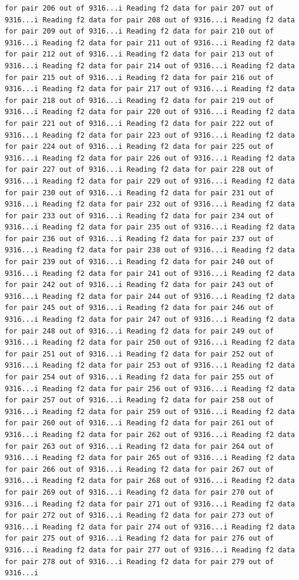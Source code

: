 \documentclass[
]{article}
\begin{document}
\begin{verbatim}
for pair 206 out of 9316...i Reading f2 data for pair 207 out of 9316...i Reading f2 data for pair 208 out of 9316...i Reading f2 data for pair 209 out of 9316...i Reading f2 data for pair 210 out of 9316...i Reading f2 data for pair 211 out of 9316...i Reading f2 data for pair 212 out of 9316...i Reading f2 data for pair 213 out of 9316...i Reading f2 data for pair 214 out of 9316...i Reading f2 data for pair 215 out of 9316...i Reading f2 data for pair 216 out of 9316...i Reading f2 data for pair 217 out of 9316...i Reading f2 data for pair 218 out of 9316...i Reading f2 data for pair 219 out of 9316...i Reading f2 data for pair 220 out of 9316...i Reading f2 data for pair 221 out of 9316...i Reading f2 data for pair 222 out of 9316...i Reading f2 data for pair 223 out of 9316...i Reading f2 data for pair 224 out of 9316...i Reading f2 data for pair 225 out of 9316...i Reading f2 data for pair 226 out of 9316...i Reading f2 data for pair 227 out of 9316...i Reading f2 data for pair 228 out of 9316...i Reading f2 data for pair 229 out of 9316...i Reading f2 data for pair 230 out of 9316...i Reading f2 data for pair 231 out of 9316...i Reading f2 data for pair 232 out of 9316...i Reading f2 data for pair 233 out of 9316...i Reading f2 data for pair 234 out of 9316...i Reading f2 data for pair 235 out of 9316...i Reading f2 data for pair 236 out of 9316...i Reading f2 data for pair 237 out of 9316...i Reading f2 data for pair 238 out of 9316...i Reading f2 data for pair 239 out of 9316...i Reading f2 data for pair 240 out of 9316...i Reading f2 data for pair 241 out of 9316...i Reading f2 data for pair 242 out of 9316...i Reading f2 data for pair 243 out of 9316...i Reading f2 data for pair 244 out of 9316...i Reading f2 data for pair 245 out of 9316...i Reading f2 data for pair 246 out of 9316...i Reading f2 data for pair 247 out of 9316...i Reading f2 data for pair 248 out of 9316...i Reading f2 data for pair 249 out of 9316...i Reading f2 data for pair 250 out of 9316...i Reading f2 data for pair 251 out of 9316...i Reading f2 data for pair 252 out of 9316...i Reading f2 data for pair 253 out of 9316...i Reading f2 data for pair 254 out of 9316...i Reading f2 data for pair 255 out of 9316...i Reading f2 data for pair 256 out of 9316...i Reading f2 data for pair 257 out of 9316...i Reading f2 data for pair 258 out of 9316...i Reading f2 data for pair 259 out of 9316...i Reading f2 data for pair 260 out of 9316...i Reading f2 data for pair 261 out of 9316...i Reading f2 data for pair 262 out of 9316...i Reading f2 data for pair 263 out of 9316...i Reading f2 data for pair 264 out of 9316...i Reading f2 data for pair 265 out of 9316...i Reading f2 data for pair 266 out of 9316...i Reading f2 data for pair 267 out of 9316...i Reading f2 data for pair 268 out of 9316...i Reading f2 data for pair 269 out of 9316...i Reading f2 data for pair 270 out of 9316...i Reading f2 data for pair 271 out of 9316...i Reading f2 data for pair 272 out of 9316...i Reading f2 data for pair 273 out of 9316...i Reading f2 data for pair 274 out of 9316...i Reading f2 data for pair 275 out of 9316...i Reading f2 data for pair 276 out of 9316...i Reading f2 data for pair 277 out of 9316...i Reading f2 data for pair 278 out of 9316...i Reading f2 data for pair 279 out of 9316...i 
\end{verbatim}
\end{document}
